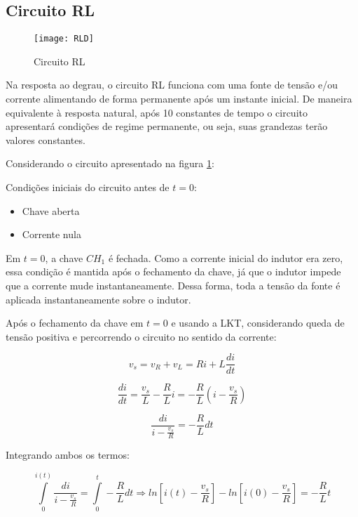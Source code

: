 \documentclass[12pt,fleqn]{book} %
\begin{document}
{        \subsection{Circuito RL}
        
        \begin{figure}[!htbp] \centering\texttt{[image: RLD]}
            \caption{Circuito RL}\label{RLD} 
        \end{figure}
        
Na resposta ao degrau, o circuito RL funciona com uma fonte de tensão e/ou corrente alimentando de forma permanente após um instante inicial. De maneira equivalente à resposta natural, após 10 constantes de tempo o circuito apresentará condições de regime permanente, ou seja, suas grandezas terão valores constantes.

Considerando o circuito apresentado na figura \ref{RLD}:

Condições iniciais do circuito antes de $t=0$:

\begin{itemize}
\item Chave aberta
\item Corrente nula
\end{itemize}

Em $t=0$, a chave $CH_1$ é fechada. Como a corrente inicial do indutor era zero, essa condição é mantida após o fechamento da chave, já que o indutor impede que a corrente mude instantaneamente. Dessa forma, toda a tensão da fonte é aplicada instantaneamente sobre o indutor.

Após o fechamento da chave em $t=0$ e usando a LKT, considerando queda de tensão positiva e percorrendo o circuito no sentido da corrente:

\begin{equation}
v_s=v_R+v_L=Ri+L\frac{di}{dt}
\end{equation}

\begin{equation}
\frac{di}{dt}=\frac{v_s}{L}-\frac{R}{L} i=-\frac{R}{L} (i-\frac{v_s}{R})
\end{equation}

\begin{equation}
\frac{di}{i-\frac{v_s}{R}} = -\frac{R}{L}dt
\end{equation}

Integrando ambos os termos:

\begin{equation}
\int\limits_{0}^{i(t)}\frac{di}{i-\frac{v_s}{R}} =\int\limits_{0}^{t} -\frac{R}{L}dt \Rightarrow ln[i(t)-\frac{v_s}{R}]-ln[i(0)-\frac{v_s}{R}]=-\frac{R}{L}t 
\end{equation}

}
\end{document}
